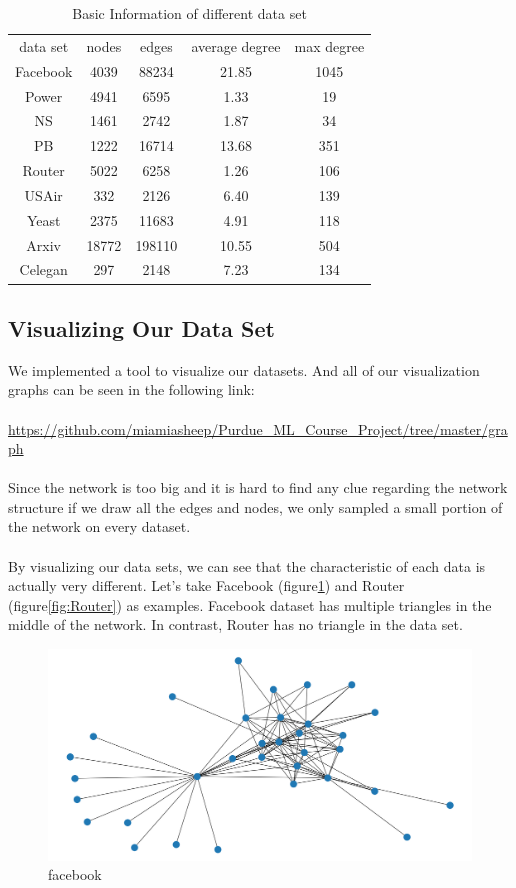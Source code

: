 \documentclass[12pt]{article}
\begin{document}
\begin{table}
\begin{center}
	\begin{tabular}{|c|c|c|c|c|}
		\hline
		data set & nodes & edges & average degree & max degree \\
		Facebook & 4039 & 88234 & 21.85 & 1045 \\
		Power & 4941 & 6595 & 1.33 & 19 \\
		NS & 1461 & 2742 & 1.87 & 34 \\
		PB & 1222 & 16714 & 13.68 & 351 \\
		Router & 5022 & 6258 & 1.26 & 106 \\
		USAir & 332 & 2126 & 6.40 & 139 \\
		Yeast & 2375 & 11683 & 4.91 & 118 \\
		Arxiv & 18772 & 198110 & 10.55 & 504 \\
		Celegan & 297 & 2148 & 7.23 & 134 \\
		\hline 
	\end{tabular}
	\caption{Basic Information of different data set}
	\label{tab:info}
\end{center}
\end{table}

\subsection{Visualizing Our Data Set}
We implemented a tool to visualize our datasets. And all of our visualization graphs can be seen in the following link:
\\
\\
\url{https://github.com/miamiasheep/Purdue_ML_Course_Project/tree/master/graph}
\\
\\
Since the network is too big and it is hard to find any clue regarding the network structure if we draw all the edges and nodes, we only sampled a small portion of the network on every dataset.
\\
\\
By visualizing our data sets, we can see that the characteristic of each data is actually very different. Let's take Facebook (figure\ref{fig:facebook}) and Router (figure\ref{fig:Router}) as examples. Facebook dataset has multiple triangles in the middle of the network. In contrast, Router has no triangle in the data set.


\begin{figure}[h]
\centering
\includegraphics[scale=0.3]{Facebook}
\caption{facebook}
\label{fig:facebook}
\end{figure}
\end{document}
